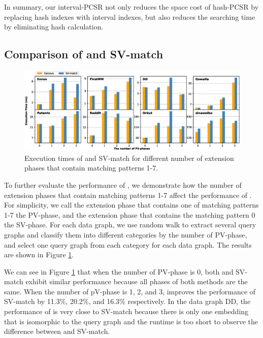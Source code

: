 In summary, our interval-PCSR not only reduces the space cost of hash-PCSR by replacing hash indexes with interval indexes, but also
reduces the searching time by eliminating hash calculation.


\subsection{Comparison of \SystemName and SV-match\label{sec:comparesv}}
\begin{figure}
\centering
\includegraphics[width=\textwidth]{./figure/compareSV.eps}
\caption{Execution times of \SystemName and SV-match for different number of extension phases that contain matching patterns 1-7.}	
\label{fig:compareSV}
\end{figure}
To further evaluate the performance of \SystemName, we demonstrate how the number of extension phases that contain matching patterns 1-7 affect the performance of \SystemName. For simplicity, we call the extension phase that contains one of matching patterns 1-7 the PV-phase, and the extension phase that contains the matching pattern 0 the SV-phase. For each data graph, we use random walk to extract several query graphs and classify them into different categories by the number of PV-phase, and select one query graph from each category for each data graph. The results are shown in Figure \ref{fig:compareSV}.

We can see in Figure \ref{fig:compareSV} that when the number of PV-phase is 0, both \SystemName and SV-match exhibit similar performance because all phases of both methods are the same. When the number of pV-phase is 1, 2, and 3, \SystemName improves the performance of SV-match by 11.3\%, 20.2\%, and 16.3\% respectively. In the data graph DD, the performance of \SystemName is very close to SV-match because there is only one embedding that is isomorphic to the query graph and the runtime is too short to observe the difference between \SystemName and SV-match.
